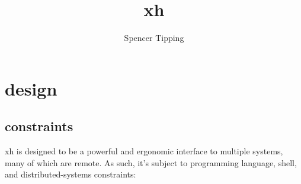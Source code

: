 \documentclass{report}
\title{xh}
\author{Spencer Tipping}
\begin{document}
\maketitle{}
\tableofcontents{}


\def\initial{{\em initial assumption}}

\part{design}\label{part:design}
\chapter{constraints}\label{chp:design-constraints}
  xh is designed to be a powerful and ergonomic interface to multiple systems,
  many of which are remote. As such, it's subject to programming language,
  shell, and distributed-systems constraints:
\end{document}
